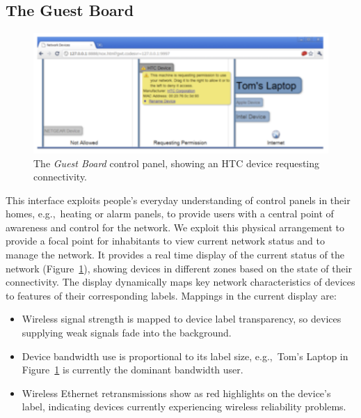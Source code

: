 


\subsection{The Guest Board} \label{s:guest-board}


\begin{figure} 
  \centering 
  \includegraphics[width=0.5\columnwidth]{control-test}
  \caption{\label{f:guest-board}The \emph{Guest Board} control panel, showing an
    HTC device requesting connectivity.}
\end{figure}

This interface exploits people's everyday understanding of control panels in
their homes, e.g.,~heating or alarm panels, to provide users with a central
point of awareness and control for the network. We exploit this physical arrangement to
provide a focal point for inhabitants to view current network status and to
manage the network.  It provides a real time display of the current status of
the network (Figure~\ref{f:guest-board}), showing devices in different zones
based on the state of their connectivity.  The display dynamically maps key
network characteristics of devices to features of their corresponding labels.
Mappings in the current display are: 

\begin{itemize}
\item Wireless signal strength is mapped to device label transparency, so
      devices supplying weak signals fade into the background.
\item Device bandwidth use is proportional to its label size, e.g.,~Tom's Laptop
      in Figure~\ref{f:guest-board} is currently the dominant bandwidth user. 
\item Wireless Ethernet retransmissions show as red highlights on the device's
  label, indicating devices currently experiencing wireless reliability problems. 
\end{itemize}

